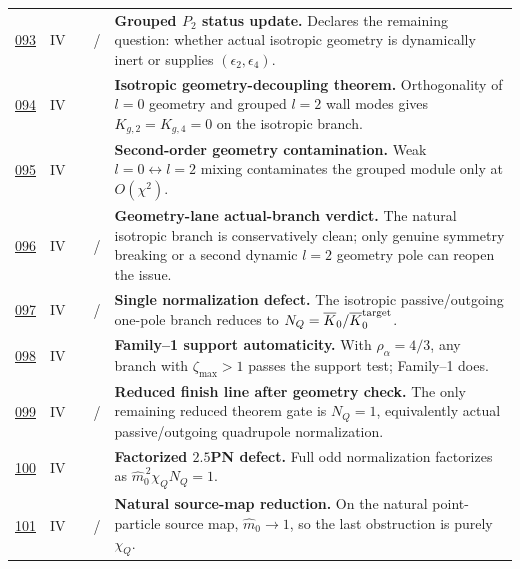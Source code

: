 {\begin{longtable}{@{}L{0.055\textwidth}L{0.075\textwidth}L{0.145\textwidth}L{0.235\textwidth}L{0.43\textwidth}@{}}
\addlinespace
\hyperref[stage:093]{093} & IV &  & \StatusExactClosure{} / \StatusOpen{} & \textbf{Grouped \(P_2\) status update.} Declares the remaining question: whether actual isotropic geometry is dynamically inert or supplies \((\epsilon_2,\epsilon_4)\). \\
\addlinespace
\hyperref[stage:094]{094} & IV &  & \StatusExactClosure{} & \textbf{Isotropic geometry-decoupling theorem.} Orthogonality of \(l=0\) geometry and grouped \(l=2\) wall modes gives \(K_{g,2}=K_{g,4}=0\) on the isotropic branch. \\
\addlinespace
\hyperref[stage:095]{095} & IV &  & \StatusExactClosure{} & \textbf{Second-order geometry contamination.} Weak \(l=0\leftrightarrow l=2\) mixing contaminates the grouped module only at \(O(\chi^2)\). \\
\addlinespace
\hyperref[stage:096]{096} & IV &  & \StatusExactClosure{} / \StatusOpen{} & \textbf{Geometry-lane actual-branch verdict.} The natural isotropic branch is conservatively clean; only genuine symmetry breaking or a second dynamic \(l=2\) geometry pole can reopen the issue. \\
\addlinespace
\hyperref[stage:097]{097} & IV &  & \StatusExactClosure{} / \StatusOpen{} & \textbf{Single normalization defect.} The isotropic passive/outgoing one-pole branch reduces to \(N_Q=\overline K_0/\overline K_0^{\rm target}\). \\
\addlinespace
\hyperref[stage:098]{098} & IV &  & \StatusExactClosure{} & \textbf{Family--1 support automaticity.} With \(\rho_\alpha=4/3\), any branch with \(\zeta_{\max}>1\) passes the support test; Family--1 does. \\
\addlinespace
\hyperref[stage:099]{099} & IV &  & \StatusExactClosure{} / \StatusOpen{} & \textbf{Reduced finish line after geometry check.} The only remaining reduced theorem gate is \(N_Q=1\), equivalently actual passive/outgoing quadrupole normalization. \\
\addlinespace
\hyperref[stage:100]{100} & IV &  & \StatusExactClosure{} & \textbf{Factorized \(2.5\)PN defect.} Full odd normalization factorizes as \(\widehat m_0^{\,2}\chi_Q N_Q=1\). \\
\addlinespace
\hyperref[stage:101]{101} & IV &  & \StatusReduced{} / \StatusExactClosure{} & \textbf{Natural source-map reduction.} On the natural point-particle source map, \(\widehat m_0\to1\), so the last obstruction is purely \(\chi_Q\). \\

\end{longtable}}
